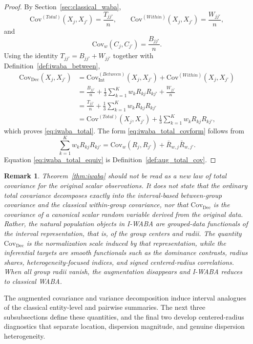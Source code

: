 \documentclass[preprint, times, 12pt, authoryear]{elsarticle}
\newtheorem{remark}{Remark}
\begin{document}
\begin{proof}
	By Section~\ref{sec:classical_waba},
	\[
	\mathrm{Cov}^{(Total)}(X_j,X_{j'})=\frac{T_{jj'}}{n},
	\qquad
	\mathrm{Cov}^{(Within)}(X_j,X_{j'})=\frac{W_{jj'}}{n},
	\]
	and
	\[
	\mathrm{Cov}_w(C_j,C_{j'})=\frac{B_{jj'}}{n}.
	\]
	Using the identity $T_{jj'}=B_{jj'}+W_{jj'}$ together with Definition~\ref{def:iwaba_between},
	\begin{align*}
		\mathrm{Cov}_{\mathrm{Dec}}(X_j,X_{j'})
		&=
		\mathrm{Cov}_{\mathrm{Int}}^{(Between)}(X_j,X_{j'})
		+
		\mathrm{Cov}^{(Within)}(X_j,X_{j'}) \\
		&=
		\frac{B_{jj'}}{n}
		+
		\frac{1}{3}\sum_{k=1}^K w_k R_{kj}R_{kj'}
		+
		\frac{W_{jj'}}{n} \\
		&=
		\frac{T_{jj'}}{n}
		+
		\frac{1}{3}\sum_{k=1}^K w_k R_{kj}R_{kj'} \\
		&=
		\mathrm{Cov}^{(Total)}(X_j,X_{j'})
		+
		\frac{1}{3}\sum_{k=1}^K w_k R_{kj}R_{kj'},
	\end{align*}
	which proves \eqref{eq:iwaba_total}. The form \eqref{eq:iwaba_total_covform} follows from
	\[
	\sum_{k=1}^K w_k R_{kj}R_{kj'}
	=
	\mathrm{Cov}_w(R_j,R_{j'})
	+
	\bar R_{w,j}\bar R_{w,j'}.
	\]
	Equation \eqref{eq:iwaba_total_equiv} is Definition~\ref{def:aug_total_cov}.
\end{proof}

\begin{remark}\label{rem:augmented_total}
	Theorem~\ref{thm:iwaba} should not be read as a new law of total covariance for the original scalar observations. It does not state that the ordinary total covariance decomposes exactly into the interval-based between-group covariance and the classical within-group covariance, nor that $\mathrm{Cov}_{\mathrm{Dec}}$ is the covariance of a canonical scalar random variable derived from the original data. Rather, the natural population objects in I-WABA are grouped-data functionals of the interval representation, that is, of the group centers and radii. The quantity \(\mathrm{Cov}_{\mathrm{Dec}}\) is the normalization scale induced by that representation, while the inferential targets are smooth functionals such as the dominance contrasts, radius shares, heterogeneity-focused indices, and signed centered-radius correlations. When all group radii vanish, the augmentation disappears and I-WABA reduces to classical WABA.
\end{remark}

The augmented covariance and variance decomposition induce interval analogues of the classical entity-level and pairwise summaries. The next three subsubsections define these quantities, and the final two develop centered-radius diagnostics that separate location, dispersion magnitude, and genuine dispersion heterogeneity.
\end{document}
